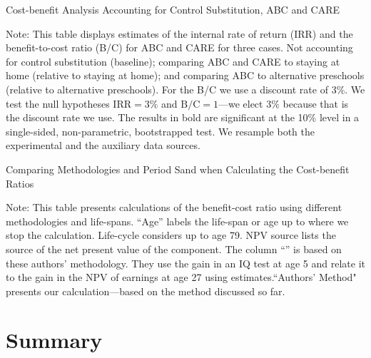 \begin{table}[H]
\begin{threeparttable}
\caption{Cost-benefit Analysis Accounting for Control Substitution, ABC and CARE}
\label{table:cbacs}
\centering

\begin{tablenotes}
\item Note: This table displays estimates of the internal rate of return (IRR) and the benefit-to-cost ratio (B/C) for ABC and CARE for three cases. Not accounting for control substitution (baseline); comparing ABC and CARE to staying at home (relative to staying at home); and comparing ABC to alternative preschools (relative to alternative preschools). For the B/C we use a discount rate of $3\%$. We test the null hypotheses $\text{IRR} = 3\%$ and $\text{B/C} = 1$---we elect $3\%$ because that is the discount rate we use. The results in bold are significant at the 10\% level in a single-sided, non-parametric, bootstrapped test. We resample both the experimental and the auxiliary data sources.
\end{tablenotes}
\end{threeparttable}
\end{table}

\begin{table}[H]
\begin{threeparttable}
\caption{Comparing Methodologies and Period Sand when Calculating the Cost-benefit Ratios}
\label{table:comparing}
\centering

\begin{tablenotes}
\item Note: This table presents calculations of the benefit-cost ratio using different methodologies and life-spans. ``Age'' labels the life-span or age up to where we stop the calculation. Life-cycle considers up to age 79. NPV source lists the source of the net present value of the component. The column ``\citet{Kline-Walters_2016_QJE}'' is based on these authors’ methodology. They use the gain in an IQ test at age 5 and relate it to the gain in the NPV of earnings at age 27 using \citet{Chetty_Friedman_etal_2010_HowDoesYour} estimates.``Authors' Method" presents our calculation---based on the method discussed so far.
\end{tablenotes}
\end{threeparttable}
\end{table}

\section{Summary} \label{section:conclusion}

